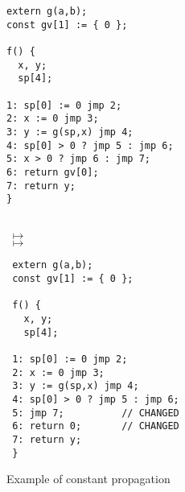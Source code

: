 
\begin{figure}
\noindent
\begin{minipage}{0.5\columnwidth}
\small
\begin{verbatim}
extern g(a,b);
const gv[1] := { 0 };

f() {
  x, y;
  sp[4];

1: sp[0] := 0 jmp 2;
2: x := 0 jmp 3;
3: y := g(sp,x) jmp 4;
4: sp[0] > 0 ? jmp 5 : jmp 6;
5: x > 0 ? jmp 6 : jmp 7;
6: return gv[0];
7: return y;
}
\end{verbatim}
\end{minipage}
\begin{minipage}{0.05\columnwidth}
\mbox{}\\[4.0cm]
$\;\mapsto$\\[0.00cm]
$\;\mapsto$\\
\end{minipage}
\begin{minipage}{0.4\columnwidth}
\small
\begin{verbatim}
 extern g(a,b);
 const gv[1] := { 0 };
 
 f() {
   x, y;
   sp[4];
 
 1: sp[0] := 0 jmp 2;
 2: x := 0 jmp 3;
 3: y := g(sp,x) jmp 4;
 4: sp[0] > 0 ? jmp 5 : jmp 6;
 5: jmp 7;          // CHANGED
 6: return 0;       // CHANGED
 7: return y;
 }
\end{verbatim}
\end{minipage}
\caption{Example of constant propagation}
\label{fig:const-prop-example}
\end{figure}


